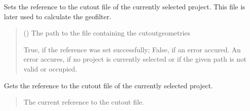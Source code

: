 \documentclass[letterpaper,10pt,english]{sphinxmanual}
\begin{document}
\begin{fulllineitems}
\begin{fulllineitems}
\label{\detokenize{apidoc/src.osm_configurator.control:src.osm_configurator.control.control.Control.set_cut_out_reference}}
\pysigstartsignatures
{}
\pysigstopsignatures
\sphinxAtStartPar
Sets the reference to the cut\sphinxhyphen{}out file of the currently selected project.
This file is later used to calculate the geofilter.
\begin{quote}\begin{description}
\sphinxAtStartPar
{} () \textendash{} The path to the file containing the cut\sphinxhyphen{}out\sphinxhyphen{}geometries

\sphinxAtStartPar
True, if the reference was set successfully; False, if an error accured. An error accures, if no project is currently selected or if the given path is not valid or occupied.

\sphinxAtStartPar
{}

\end{description}\end{quote}

\end{fulllineitems}


\begin{fulllineitems}
\label{\detokenize{apidoc/src.osm_configurator.control:src.osm_configurator.control.control.Control.get_cut_out_reference}}
\pysigstartsignatures
{}
\pysigstopsignatures
\sphinxAtStartPar
Gets the reference to the cut\sphinxhyphen{}out file of the currently selected project.
\begin{quote}\begin{description}
\sphinxAtStartPar
The current reference to the cut\sphinxhyphen{}out file.

\sphinxAtStartPar
{}


\end{description}
\end{quote}
\end{fulllineitems}
\end{fulllineitems}
\end{document}
